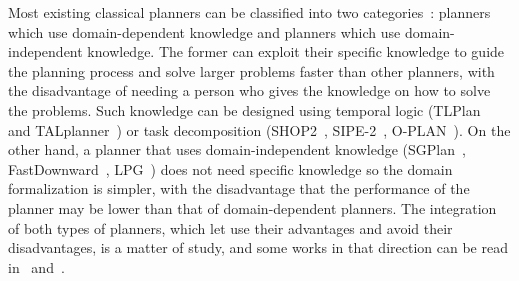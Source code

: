 \documentclass[runningheads,a4paper]{llncs}
\begin{document}

Most existing classical planners can be classified into two categories~\cite{ingrand_ghallab_2013}: planners which use domain-dependent knowledge and planners which use domain-independent knowledge. The former can exploit their specific knowledge to guide the planning process and solve larger problems faster than other planners, with the disadvantage of needing a person who gives the knowledge on how to solve the problems. Such knowledge can be designed using temporal logic (TLPlan~\cite{Bacchus00usingtemporal} and TALplanner~\cite{Kvarnstrom01talplanner}) or task decomposition (SHOP2~\cite{Nau03shop2}, SIPE-2~\cite{Wilkins}, O-PLAN~\cite{Currie90}). On the other hand, a planner that uses domain-independent knowledge (SGPlan~\cite{Chen06}, FastDownward~\cite{Helmert06}, LPG~\cite{Gerevini01}) does not need specific knowledge so the domain formalization is simpler, with the disadvantage that the performance of the planner may be lower than that of domain-dependent planners. The integration of both types of planners, which let use their advantages and avoid their disadvantages, is a matter of study, and some works in that direction can be read in~\cite{Gerevini02} and~\cite{Shivashankar}.

\end{document}
